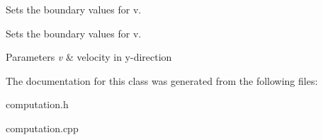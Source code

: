 Sets the boundary values for v. 

Sets the boundary values for v. 
\begin{DoxyParams}{Parameters}
{\em v} & velocity in y-\/direction \\
\hline
\end{DoxyParams}


The documentation for this class was generated from the following files\-:\begin{DoxyCompactItemize}
\item 
computation.\-h\item 
computation.\-cpp\end{DoxyCompactItemize}
